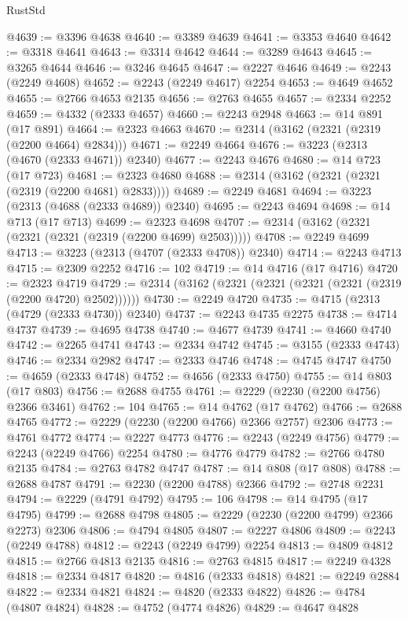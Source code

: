 \begin{lexlean}{RustStd}
\begin{coremodule}
@4639 := @3396 @4638
@4640 := @3389 @4639
@4641 := @3353 @4640
@4642 := @3318 @4641
@4643 := @3314 @4642
@4644 := @3289 @4643
@4645 := @3265 @4644
@4646 := @3246 @4645
@4647 := @2227 @4646
@4649 := @2243 (@2249 @4608)
@4652 := @2243 (@2249 @4617) @2254
@4653 := @4649 @4652
@4655 := @2766 @4653 @2135
@4656 := @2763 @4655
@4657 := @2334 @2252
@4659 := @4332 (@2333 @4657)
@4660 := @2243 @2948
@4663 := @14 @891 (@17 @891)
@4664 := @2323 @4663
@4670 := @2314 (@3162 (@2321 (@2319 (@2200 @4664) @2834)))
@4671 := @2249 @4664
@4676 := @3223 (@2313 (@4670 (@2333 @4671)) @2340)
@4677 := @2243 @4676
@4680 := @14 @723 (@17 @723)
@4681 := @2323 @4680
@4688 := @2314 (@3162 (@2321 (@2321 (@2319 (@2200 @4681) @2833))))
@4689 := @2249 @4681
@4694 := @3223 (@2313 (@4688 (@2333 @4689)) @2340)
@4695 := @2243 @4694
@4698 := @14 @713 (@17 @713)
@4699 := @2323 @4698
@4707 := @2314 (@3162 (@2321 (@2321 (@2321 (@2319 (@2200 @4699) @2503)))))
@4708 := @2249 @4699
@4713 := @3223 (@2313 (@4707 (@2333 @4708)) @2340)
@4714 := @2243 @4713
@4715 := @2309 @2252
@4716 := 102
@4719 := @14 @4716 (@17 @4716)
@4720 := @2323 @4719
@4729 := @2314 (@3162 (@2321 (@2321 (@2321 (@2321 (@2319 (@2200 @4720) @2502))))))
@4730 := @2249 @4720
@4735 := @4715 (@2313 (@4729 (@2333 @4730)) @2340)
@4737 := @2243 @4735 @2275
@4738 := @4714 @4737
@4739 := @4695 @4738
@4740 := @4677 @4739
@4741 := @4660 @4740
@4742 := @2265 @4741
@4743 := @2334 @4742
@4745 := @3155 (@2333 @4743)
@4746 := @2334 @2982
@4747 := @2333 @4746
@4748 := @4745 @4747
@4750 := @4659 (@2333 @4748)
@4752 := @4656 (@2333 @4750)
@4755 := @14 @803 (@17 @803)
@4756 := @2688 @4755
@4761 := @2229 (@2230 (@2200 @4756) @2366 @3461)
@4762 := 104
@4765 := @14 @4762 (@17 @4762)
@4766 := @2688 @4765
@4772 := @2229 (@2230 (@2200 @4766) @2366 @2757) @2306
@4773 := @4761 @4772
@4774 := @2227 @4773
@4776 := @2243 (@2249 @4756)
@4779 := @2243 (@2249 @4766) @2254
@4780 := @4776 @4779
@4782 := @2766 @4780 @2135
@4784 := @2763 @4782 @4747
@4787 := @14 @808 (@17 @808)
@4788 := @2688 @4787
@4791 := @2230 (@2200 @4788) @2366
@4792 := @2748 @2231
@4794 := @2229 (@4791 @4792)
@4795 := 106
@4798 := @14 @4795 (@17 @4795)
@4799 := @2688 @4798
@4805 := @2229 (@2230 (@2200 @4799) @2366 @2273) @2306
@4806 := @4794 @4805
@4807 := @2227 @4806
@4809 := @2243 (@2249 @4788)
@4812 := @2243 (@2249 @4799) @2254
@4813 := @4809 @4812
@4815 := @2766 @4813 @2135
@4816 := @2763 @4815
@4817 := @2249 @4328
@4818 := @2334 @4817
@4820 := @4816 (@2333 @4818)
@4821 := @2249 @2884
@4822 := @2334 @4821
@4824 := @4820 (@2333 @4822)
@4826 := @4784 (@4807 @4824)
@4828 := @4752 (@4774 @4826)
@4829 := @4647 @4828

\end{coremodule}
\end{lexlean}
